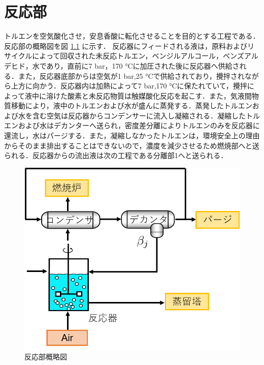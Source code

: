 \documentclass[a4j]{jsreport}
\begin{document}
\newpage
\chapter{反応部}
トルエンを空気酸化させ，安息香酸に転化させることを目的とする工程である．
反応部の概略図を図 \ref{反応部設計結果の概略図} に示す．
反応器にフィードされる液は，原料およびリサイクルによって回収された未反応トルエン，ベンジルアルコール，ベンズアルデヒド，水であり，直前に7 \si{\bar}，170 \si{\degreeCelsius}に加圧された後に反応器へ供給される．また，反応器底部からは空気が1 \si{\bar},25 \si{\degreeCelsius}で供給されており，攪拌されながら上方に向かう．反応器内は加熱によって7 \si{\bar},170 \si{\degreeCelsius}に保たれていて，攪拌によって液中に溶けた酸素と未反応物質は触媒酸化反応を起こす．また，気液間物質移動により，液中のトルエンおよび水が盛んに蒸発する．蒸発したトルエンおよび水を含む空気は反応器からコンデンサーに流入し凝縮される．凝縮したトルエンおよび水はデカンターへ送られ，密度差分離によりトルエンのみを反応器に還流し，水はパージする．また，凝縮しなかったトルエンは，環境安全上の理由からそのまま排出することはできないので，濃度を減少させるため燃焼部へと送られる．反応器からの流出液は次の工程である分離部1へと送られる．
\begin{figure}[htbp]
    \begin{center}
        \includegraphics[scale=0.7]{ReactionSection.png}
        \caption{反応部概略図}
        \label{反応部設計結果の概略図}
    \end{center}
\end{figure}
\end{document}
